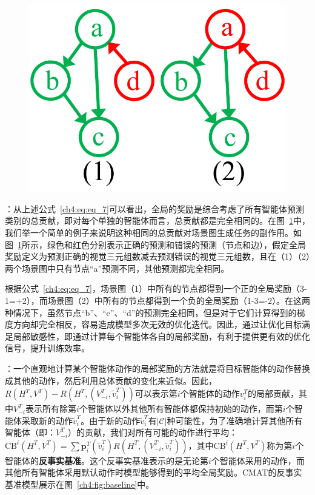 \begin{figure}
    \centering
        \includegraphics[width=0.8\linewidth]{chapter4/res/local_sensitive.pdf}
    \label{ch4:fig:local_sensitive}
\end{figure}

\textbf{}：从上述公式~\eqref{ch4:eq:eq_7}可以看出，全局的奖励是综合考虑了所有智能体预测类别的总贡献，即对每个单独的智能体而言，总贡献都是完全相同的。在图~\ref{ch4:fig:local_sensitive}中，我们举一个简单的例子来说明这种相同的总贡献对场景图生成任务的副作用。如图~\ref{ch4:fig:local_sensitive}所示，绿色和红色分别表示正确的预测和错误的预测（节点和边），假定全局奖励定义为预测正确的视觉三元组数减去预测错误的视觉三元组数，且在（1）（2）两个场景图中只有节点“a”预测不同，其他预测都完全相同。

根据公式~\eqref{ch4:eq:eq_7}，场景图（1）中所有的节点都得到一个正的全局奖励（3-1=+2），而场景图（2）中所有的节点都得到一个负的全局奖励（1-3=-2）。在这两种情况下，虽然节点“b”、“c”、“d”的预测完全相同，但是对于它们计算得到的梯度方向却完全相反，容易造成模型多次无效的优化迭代。因此，通过让优化目标满足局部敏感性，即通过计算每个智能体各自的局部奖励，有利于提供更有效的优化信号，提升训练效率。


\textbf{}：一个直观地计算某个智能体动作的局部奖励的方法就是将目标智能体的动作替换成其他的动作，然后利用总体贡献的变化来近似。因此，$R(H^T, V^T) - R(H^T, (V^T_{-i}, \tilde{v}^T_i))$可以表示第$i$个智能体的动作$v^T_i$的局部贡献，其中$V^T_{-i}$表示所有除第$i$个智能体以外其他所有智能体都保持初始的动作，而第$i$个智能体采取新的动作$\tilde{v}^T_i$。由于新的动作$\tilde{v}^T_i$有$|\mathcal{C}|$种可能性，为了准确地计算其他所有智能体（即：$V^T_{-i}$）的贡献，我们对所有可能的动作进行平均：$ \text{CB}^i(H^T, V^T) = \sum \bm{p}^T_i(\tilde{v}^T_i) R(H^T, (V^T_{-i}, \tilde{v}^T_i))$，其中$\text{CB}^i(H^T, V^T)$称为第$i$个智能体的\textbf{反事实基准}。这个反事实基准表示的是无论第$i$个智能体采用的动作，而其他所有智能体采用默认动作时模型能够得到的平均全局奖励。CMAT的反事实基准模型展示在图~\ref{ch4:fig:baseline}中。

